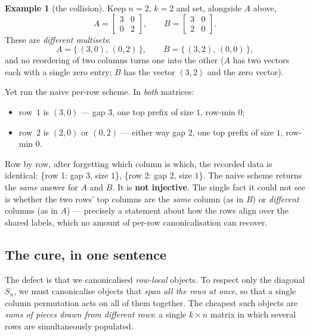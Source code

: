 \documentclass[11pt,a4paper]{article}
\theoremstyle{definition}
\newtheorem{example}[definition]{Example}
\theoremstyle{plain}
\newcommand{\Sn}{S_n}
\begin{document}
\begin{example}[the collision]\label{ex:collision}
Keep $n=2$, $k=2$ and set, alongside $A$ above,
\[
   A=\begin{bmatrix}3&0\\0&2\end{bmatrix},
   \qquad
   B=\begin{bmatrix}3&0\\2&0\end{bmatrix}.
\]
These are \emph{different multisets}:
\[
   A=\bigl\{\,(3,0),\,(0,2)\,\bigr\},
   \qquad
   B=\bigl\{\,(3,2),\,(0,0)\,\bigr\},
\]
and no reordering of two columns turns one into the other ($A$ has two vectors
each with a single zero entry; $B$ has the vector $(3,2)$ and the zero vector).

Yet run the naive per-row scheme. In \emph{both} matrices:
\begin{itemize}[nosep,leftmargin=*]
\item row~$1$ is $(3,0)$ --- gap $3$, one top prefix of size $1$, row-min $0$;
\item row~$2$ is $(2,0)$ or $(0,2)$ --- either way gap $2$, one top prefix of
      size $1$, row-min $0$.
\end{itemize}
Row by row, after forgetting which column is which, the recorded data is
identical: \{row 1: gap $3$, size $1$\}, \{row 2: gap $2$, size $1$\}. The naive
scheme returns the \emph{same} answer for $A$ and $B$. It is \textbf{not
injective}. The single fact it could not see is whether the two rows' top
columns are the \emph{same} column (as in $B$) or \emph{different} columns
(as in $A$) --- precisely a statement about how the rows align over the shared
labels, which no amount of per-row canonicalisation can recover.
\end{example}

\subsection{The cure, in one sentence}

The defect is that we canonicalised \emph{row-local} objects. To respect only
the diagonal $\Sn$, we must canonicalise objects that \emph{span all the rows at
once}, so that a single column permutation acts on all of them together. The
cheapest such objects are \emph{sums of pieces drawn from different rows}: a
single $k\times n$ matrix in which several rows are simultaneously populated.
\end{document}
